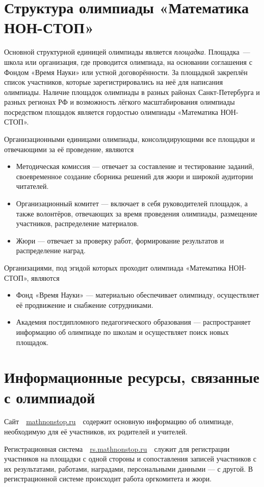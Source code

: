 \documentclass[a4paper,12pt]{article}
\newcommand{\mns}{«Математика НОН-СТОП»\xspace}
\begin{document}
\section{Структура олимпиады \mns}

Основной структурной единицей олимпиады является {\itshape площадка}. Площадка~— школа или организация, где проводится олимпиада, на основании соглашения с Фондом «Время Науки» или устной договорённости. За площадкой закреплён список участников, которые зарегистрировались на неё для написания олимпиады. Наличие площадок олимпиады в разных районах Санкт-Петербурга и разных регионах РФ и возможность лёгкого масштабирования олимпиады посредством площадок является гордостью олимпиады \mns.

Организационными единицами олимпиады, консолидирующими все площадки и отвечающими за её проведение, являются \vspace{-4mm}

\begin{itemize}
\item Методическая комиссия — отвечает за составление и тестирование заданий, своевременное создание сборника решений для жюри и широкой аудитории читателей.

\item Организационный комитет — включает в себя руководителей площадок, а также волонтёров, отвечающих за время проведения олимпиады, размещение участников, распределение материалов.

\item Жюри — отвечает за проверку работ, формирование результатов и распределение наград.
\end{itemize}

Организациями, под эгидой которых проходит олимпиада \mns, являются \vspace{-4mm}

\begin{itemize}
\item Фонд «Время Науки» — материально обеспечивает олимпиаду, осуществляет её продвижение и снабжение сотрудниками.

\item Академия постдипломного педагогического образования — распространяет информацию об олимпиаде по школам и осуществляет поиск новых площадок.
\end{itemize}

\section{Информационные ресурсы, связанные с олимпиадой}

Сайт\ \ \url{mathnonstop.ru}\ \ содержит основную информацию об олимпиаде, необходимую для её участников, их родителей и учителей.

Регистрационная система\ \ \url{rs.mathnonstop.ru}\ \ служит для регистрации участников на площадки с одной стороны и сопоставления записей участников с их результатами, работами, наградами, персональными данными — с другой. В регистрационной системе происходит работа оргкомитета и жюри.
\end{document}
